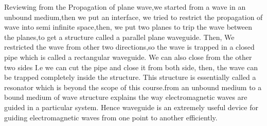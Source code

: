 Reviewing from the Propagation  of plane wave,we started from a wave in an unbound  medium,then we put an interface, we tried to restrict the propagation of wave into semi infinite space,then, we put two planes to trip the wave between  the  planes,to get a structure called a parallel plane waveguide. Then, We restricted the wave from other two directions,so the wave is trapped in a closed pipe which is called a rectangular  waveguide. We can also close from the other two sides I.e we can cut the pipe and close it from both side, then, the wave can be trapped  completely  inside the structure. This structure is essentially  called a resonator which is beyond the scope of this course.from an unbound  medium  to a bound medium  of wave structure explains the way electromagnetic waves are guided in a particular  system. Hence waveguide is an extremely useful device for guiding electromagnetic waves from  one point to another efficiently.